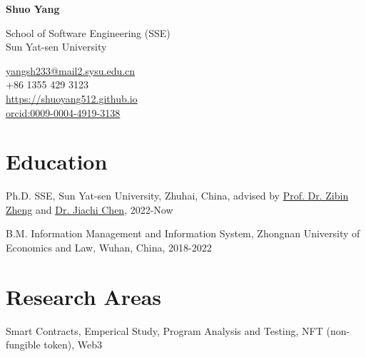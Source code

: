 \documentclass[12pt,letterpaper]{report}
\newcommand{\myname}{Shuo Yang}
\newcommand{\namefont}[1]{{\normalfont\bfseries\Huge{#1}}}
\newcommand{\listitemspace}{0.25em}
\renewenvironment{itemize}
{\begin{list}{}{\setlength{\leftmargin}{0em}
                \setlength{\parskip}{0em}
                \setlength{\itemsep}{\listitemspace}
                \setlength{\parsep}{\listitemspace}}}
{\end{list}}
\begin{document}
    \raggedright{}

    \namefont{\myname}

    \vspace{1em}
    \begin{minipage}[t]{0.700\textwidth}
        School of Software Engineering (SSE)\\
        Sun Yat-sen University
    \end{minipage}
    \begin{minipage}[t]{0.295\textwidth}
        \flushright{}
        \href{yangsh233@mail2.sysu.edu.cn}{yangsh233@mail2.sysu.edu.cn} \\
        +86 1355 429 3123 \\
        \href{https://shuoyang512.github.io}{https://shuoyang512.github.io}\\
        \href{https://orcid.org/0009-0004-4919-3138}{orcid:0009-0004-4919-3138}
    \end{minipage}

    \section*{Education}
    
    \begin{tablist}
      \item[Ph.D.] \tab{}SSE, Sun Yat-sen University, Zhuhai, China, advised by \href{http://www.zibinzheng.com/cv}{Prof. Dr. Zibin Zheng} and \href{}{Dr. Jiachi Chen}, 2022-Now
      \item[B.M.] \tab{}Information Management and Information System, Zhongnan University of Economics and Law, Wuhan, China, 2018-2022
    \end{tablist}
    
    \section*{Research Areas}
    \begin{itemize}
      \item Smart Contracts, Emperical Study, Program Analysis and Testing, NFT (non-fungible token), Web3
    \end{itemize}
    
\end{document}
